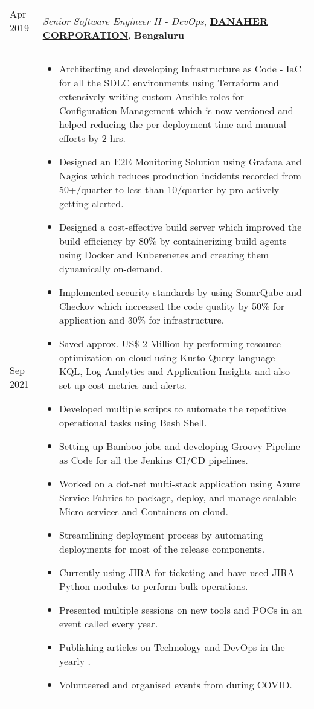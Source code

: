 \documentclass[11pt, a4paper]{article}
\begin{document}
\noindent\begin{tabular}{L{1.7cm}!{\color{gray}\vrule}l}
Apr 2019 -  & \textit{Senior Software Engineer II - DevOps}, \textcolor{NavyBlue}{\textbf{\href{https://www.danaher.com/who-we-are/danaher-story}{DANAHER CORPORATION}}},  \textbf{Bengaluru} \\
Sep 2021 &
  \begin{minipage}[t]{0.86\textwidth}
    \begin{itemize}[leftmargin=*]
    \itemsep-0.5em 
    \item Architecting and developing Infrastructure as Code - IaC for all the SDLC environments using Terraform and extensively writing custom Ansible roles for Configuration Management which is now versioned and helped reducing the per deployment time and manual efforts by 2 hrs.
    \item Designed an E2E Monitoring Solution using Grafana and Nagios which reduces production incidents recorded from 50+/quarter to less than 10/quarter by pro-actively getting alerted.
    \item Designed a cost-effective build server which improved the build efficiency by 80\% by containerizing build agents using Docker and Kuberenetes and creating them dynamically on-demand.
    \item Implemented security standards by using SonarQube and Checkov which increased the code quality by 50\% for application and 30\% for infrastructure. 
     \item Saved approx. US\$ 2 Million by performing resource optimization on cloud using Kusto Query language - KQL, Log Analytics and Application Insights and also set-up cost metrics and alerts.
     \item Developed multiple scripts to automate the repetitive operational tasks using Bash Shell.
     \item Setting up Bamboo jobs and developing Groovy Pipeline as Code for all the Jenkins CI/CD pipelines. 
     \item Worked on a dot-net multi-stack application using Azure Service Fabrics to package, deploy, and manage scalable Micro-services and Containers on cloud.
     \item Streamlining deployment process by automating deployments for most of the release components.
     \item Currently using JIRA for ticketing and have used JIRA Python modules to perform bulk operations.
    \item Presented multiple sessions on new tools and POCs in an event called  every year.
    \item Publishing articles on Technology and DevOps in the yearly .
    \item Volunteered and organised  events from  during COVID.
    \end{itemize}
  \end{minipage}
\end{tabular} 
\end{document}
